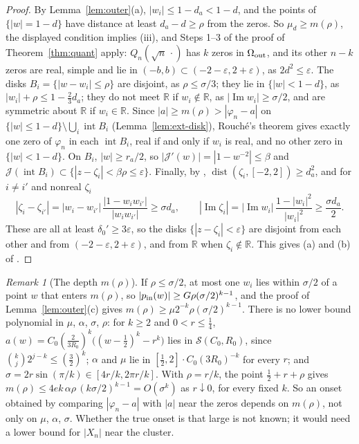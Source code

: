 \documentclass[11pt]{amsart}
\theoremstyle{definition}
\theoremstyle{remark}
\newtheorem{remark}[theorem]{Remark}
\numberwithin{equation}{section}
\newcommand{\R}{\mathbb{R}}
\newcommand{\eps}{\varepsilon}
\DeclareMathOperator{\im}{Im}
\DeclareMathOperator{\dist}{dist}
\begin{document}
\begin{proof}
By Lemma~\ref{lem:outer}(a), $|w_i|\le1-d_a<1-d$, and the points of $\{|w|=1-d\}$ have distance at least $d_a-d\ge\rho$ from the zeros. So $\mu_d\ge m(\rho)$, the displayed condition implies (iii), and Steps 1--3 of the proof of Theorem~\ref{thm:quant} apply: $Q_n(\sqrt n\,\cdot)$ has $k$ zeros in $\Omega_{\rm out}$, and its other $n-k$ zeros are real, simple and lie in $(-b,b)\subset(-2-\eps,2+\eps)$, as $2d^2\le\eps$. The disks $B_i=\{|w-w_i|\le\rho\}$ are disjoint, as $\rho\le\sigma/3$; they lie in $\{|w|<1-d\}$, as $|w_i|+\rho\le1-\frac23d_a$; they do not meet $\R$ if $w_i\notin\R$, as $|\im w_i|\ge\sigma/2$, and are symmetric about $\R$ if $w_i\in\R$. Since $|a|\ge m(\rho)>|\varphi_n-a|$ on $\{|w|\le1-d\}\setminus\bigcup_i\operatorname{int}B_i$ (Lemma~\ref{lem:ext-disk}), Rouch\'e's theorem gives exactly one zero of $\varphi_n$ in each $\operatorname{int}B_i$, real if and only if $w_i$ is real, and no other zero in $\{|w|<1-d\}$. On $B_i$, $|w|\ge r_a/2$, so $|\mathcal J'(w)|=|1-w^{-2}|\le\beta$ and $\mathcal J(\operatorname{int}B_i)\subset\{|z-\zeta_i|<\beta\rho\le\eps\}$. Finally, by \cite[\eqref{M-eq:joukowski-dist}]{Main}, $\dist(\zeta_i,[-2,2])\ge d_a^2$, and for $i\ne i'$ and nonreal $\zeta_i$
\[
|\zeta_i-\zeta_{i'}|=|w_i-w_{i'}|\,\frac{|1-w_iw_{i'}|}{|w_iw_{i'}|}\ge\sigma d_a,\qquad|\im\zeta_i|=|\im w_i|\,\frac{1-|w_i|^2}{|w_i|^2}\ge\frac{\sigma d_a}2 .
\]
These are all at least $\delta_0'\ge3\eps$, so the disks $\{|z-\zeta_i|<\eps\}$ are disjoint from each other and from $(-2-\eps,2+\eps)$, and from $\R$ when $\zeta_i\notin\R$. This gives (a) and (b) of \cite[Theorem~\ref{M-thm:main}]{Main}.
\end{proof}

\begin{remark}[The depth $m(\rho)$]\label{rem:depth}
If $\rho\le\sigma/2$, at most one $w_i$ lies within $\sigma/2$ of a point $w$ that enters $m(\rho)$, so $|p_{\rm in}(w)|\ge G\rho(\sigma/2)^{k-1}$, and the proof of Lemma~\ref{lem:outer}(c) gives $m(\rho)\ge\mu2^{-k}\rho(\sigma/2)^{k-1}$. There is no lower bound polynomial in $\mu$, $\alpha$, $\sigma$, $\rho$: for $k\ge2$ and $0<r\le\frac14$, $a(w)=C_0(\frac2{3R_0})^k\bigl((w-\frac12)^k-r^k\bigr)$ lies in $\mathcal S(C_0,R_0)$, since $\binom kj2^{j-k}\le(\frac32)^k$; $\alpha$ and $\mu$ lie in $[\frac12,2]\cdot C_0(3R_0)^{-k}$ for every $r$; and $\sigma=2r\sin(\pi/k)\in[4r/k,2\pi r/k]$. With $\rho=r/k$, the point $\frac12+r+\rho$ gives $m(\rho)\le4ek\,\alpha\rho\,(k\sigma/2)^{k-1}=O(\sigma^k)$ as $r\downarrow0$, for every fixed $k$. So an onset obtained by comparing $|\varphi_n-a|$ with $|a|$ near the zeros depends on $m(\rho)$, not only on $\mu$, $\alpha$, $\sigma$. Whether the true onset is that large is not known; it would need a lower bound for $|X_n|$ near the cluster.
\end{remark}
\end{document}
